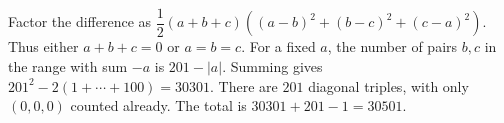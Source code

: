Factor the difference as $\dfrac{1}{2}(a+b+c)((a-b)^2+(b-c)^2+(c-a)^2)$. Thus either $a+b+c=0$ or $a=b=c$. For a fixed $a$, the number of pairs $b,c$ in the range with sum $-a$ is $201-|a|$. Summing gives $201^2-2(1+\cdots+100)=30301$. There are $201$ diagonal triples, with only $(0,0,0)$ counted already. The total is $30301+201-1=\boxed{30501}$.
